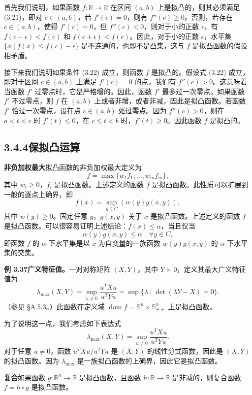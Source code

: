 \documentclass[UTF8, 12pt, fontset=fandol, oneside]{ctexart}
\DeclareMathOperator{\dom}{dom}
\begin{document}
首先我们说明，如果函数 $f:\mathbb{R}\to\mathbb{R}$ 在区间 $(a,b)$ 上是拟凸的，则其必须满足 (3.21)，即对 $c\in(a,b)$，若 $f'(c)=0$，则有 $f''(c)\geq0$。否则，若存在 $c\in(a,b)$，使得 $f'(c)=0$，但 $f''(c)<0$，则对于小的正数 $\epsilon$，有 $f(c-\epsilon)<f(c)$ 和 $f(c+\epsilon)<f(c)$。因此，对于小的正数 $\epsilon$，水平集 $\{x\mid f(x)\leq f(c)-\epsilon\}$ 是不连通的，也即不是凸集，这与 $f$ 是拟凸函数的假设相矛盾。

接下来我们说明如果条件 (3.22) 成立，则函数 $f$ 是拟凸的。假设式 (3.22) 成立，即对于区间 $c\in(a,b)$ 上满足 $f'(c)=0$ 的点，我们有 $f''(c)>0$。这意味着当函数 $f'$ 过零点时，它是严格增的。因此，函数 $f'$ 最多过一次零点。如果函数 $f'$ 不过零点，则 $f$ 在 $(a,b)$ 上或者非增，或者非减，因此是拟凸函数。若函数 $f'$ 恰过一次零点，设在点 $c\in(a,b)$ 处过零点。因为 $f''(c)>0$，则在 $a<t<c$ 时 $f'(t)\leq0$，在 $c\leq t<b$ 时，$f'(t)\geq0$。因此函数 $f$ 是拟凸的。

\subsection*{3.4.4\quad 保拟凸运算}

\noindent\textbf{非负加权最大}\quad 拟凸函数的非负加权最大定义为
\[
f=\max\{w_1f_1,\ldots,w_mf_m\},
\]
其中 $w_i\geq0$，$f_i$ 是拟凸函数。上述定义的函数 $f$ 是拟凸函数。此性质可以扩展到一般的逐点上确界，即
\[
f(x)=\sup_{y\in C}\left(w(y)g(x,y)\right),
\]
其中 $w(y)\geq0$。固定任意 $y$，$g(x,y)$ 关于 $x$ 是拟凸函数。上述定义的函数 $f$ 是拟凸函数。可以很容易证明上述结论：$f(x)\leq\alpha$，当且仅当
\[
w(y)g(x,y)\leq\alpha\quad \forall y\in C,
\]
即函数 $f$ 的 $\alpha$-下水平集是以 $x$ 为自变量的一族函数 $w(y)g(x,y)$ 的 $\alpha$-下水平集的交集。

\noindent\textbf{例 3.37\quad 广义特征值。}\quad 一对对称矩阵 $(X,Y)$，其中 $Y\succ0$，定义其最大广义特征值为
\[
\lambda_{\max}(X,Y)=\sup_{u\neq0}\frac{u^TXu}{u^TYu}
=\sup\{\lambda\mid \det(\lambda Y-X)=0\}.
\]
（参见 \S A.5.3。）此函数在定义域 $\dom f=\mathbb{S}^n\times\mathbb{S}_{++}^n$ 上是拟凸函数。

为了说明这一点，我们考虑如下表达式
\[
\lambda_{\max}(X,Y)=\sup_{u\neq0}\frac{u^TXu}{u^TYu}.
\]
对于任意 $u\neq0$，函数 $u^TXu/u^TYu$ 是 $(X,Y)$ 的线性分式函数，因此是 $(X,Y)$ 的拟凸函数。因为 $\lambda_{\max}$ 是一族拟凸函数的上确界，因此它是拟凸函数。

\noindent\textbf{复合}\quad 如果函数 $g:\mathbb{R}^n\to\mathbb{R}$ 是拟凸函数，且函数 $h:\mathbb{R}\to\mathbb{R}$ 是非减的，则复合函数 $f=h\circ g$ 是拟凸函数。
\end{document}
